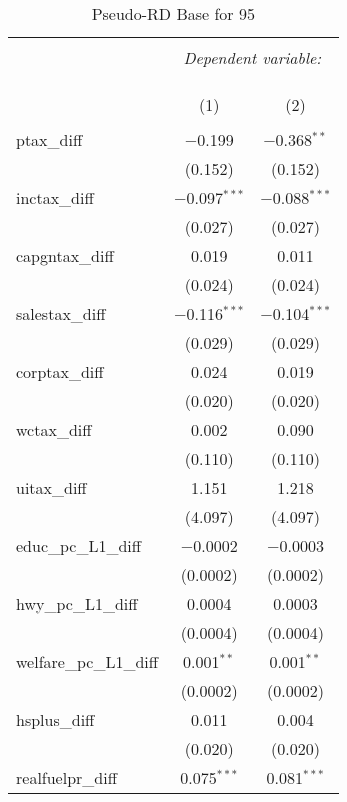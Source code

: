 
\begin{table}[!htbp] \centering 
  \caption{Pseudo-RD Base for  95} 
  \label{} 
\begin{tabular}{@{\extracolsep{5pt}}lcc} 
\\[-1.8ex]\hline 
\hline \\[-1.8ex] 
 & \multicolumn{2}{c}{\textit{Dependent variable:}} \\ 
\cline{2-3} 
\\[-1.8ex] & \multicolumn{2}{c}{ } \\ 
\\[-1.8ex] & (1) & (2)\\ 
\hline \\[-1.8ex] 
 ptax\_diff & $-$0.199 & $-$0.368$^{**}$ \\ 
  & (0.152) & (0.152) \\ 
  inctax\_diff & $-$0.097$^{***}$ & $-$0.088$^{***}$ \\ 
  & (0.027) & (0.027) \\ 
  capgntax\_diff & 0.019 & 0.011 \\ 
  & (0.024) & (0.024) \\ 
  salestax\_diff & $-$0.116$^{***}$ & $-$0.104$^{***}$ \\ 
  & (0.029) & (0.029) \\ 
  corptax\_diff & 0.024 & 0.019 \\ 
  & (0.020) & (0.020) \\ 
  wctax\_diff & 0.002 & 0.090 \\ 
  & (0.110) & (0.110) \\ 
  uitax\_diff & 1.151 & 1.218 \\ 
  & (4.097) & (4.097) \\ 
  educ\_pc\_L1\_diff & $-$0.0002 & $-$0.0003 \\ 
  & (0.0002) & (0.0002) \\ 
  hwy\_pc\_L1\_diff & 0.0004 & 0.0003 \\ 
  & (0.0004) & (0.0004) \\ 
  welfare\_pc\_L1\_diff & 0.001$^{**}$ & 0.001$^{**}$ \\ 
  & (0.0002) & (0.0002) \\ 
  hsplus\_diff & 0.011 & 0.004 \\ 
  & (0.020) & (0.020) \\ 
  realfuelpr\_diff & 0.075$^{***}$ & 0.081$^{***}$ \\ 

\end{tabular}
\end{table}
